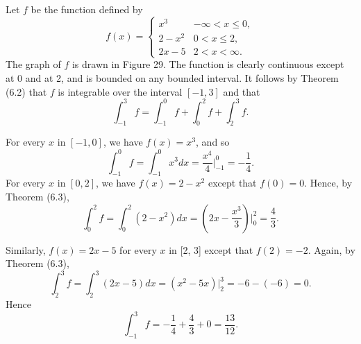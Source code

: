 \begin{example}
Let $f$ be the function defined by 
$$
f(x) = \left\{ \begin{array}{lc}
x^3           & -\infty < x \leq 0,  \\
2 - x^2      &   0 < x \leq 2, \\
2x - 5        &   2 < x < \infty. 
\end{array}
\right .
$$
\noindent The graph of $f$ is drawn in Figure 29. The function is clearly continuous except at 0 and at 2, and is bounded on any bounded interval. It follows by Theorem (6.2) that $f$ is integrable over the interval $[-1, 3]$ and that 
$$
\int_{-1}^3 f = \int_{-1}^0 f + \int_0^2 f + \int_2^3 f  .
$$

\noindent For every $x$ in $[-1, 0]$, we have $f(x) = x^3$, and so
$$
\int_{-1}^0 f = \int_{-1}^0 x^3 dx = \frac{x^4}{4} \Big|_{-1}^0 = - \frac{1}{4}.
$$
\noindent For every $x$ in $[0, 2]$, we have $f(x) = 2 - x^2$ except that $f(0) = 0$. Hence, by Theorem (6.3),
$$
\int_0^2 f = \int_0^2 (2 - x^2) dx = (2x - \frac{x^3}{3}) \Big|_0^2 = \frac{4}{3}.
$$

\noindent Similarly, $f(x) = 2x - 5$ for every $x$ in [2, 3] except that $f(2) = - 2$. Again, by Theorem (6.3),
$$
\int_2^3 f = \int_2^3 (2x - 5) dx = (x^2 - 5x)\big|_2^3 = - 6 - (- 6)= 0.
$$
\noindent Hence
$$
\int_{-1}^3 f = -\frac{1}{4} + \frac{4}{3} + 0 = \frac{13}{12}.
$$
\end{example}

